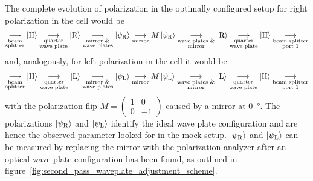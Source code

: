 The complete evolution of polarization in the optimally configured setup for right polarization in the cell would be
\begin{align}
    \label{eq:second_pass_waveplate_adjustment_cascade_r}
    \underset{\substack{\text{beam}\\\text{splitter}}}{\longrightarrow}
    \Ket{\text{H}} 
    \underset{\substack{\text{quarter}\\\text{wave plate}}}{\longrightarrow}
    \Ket{\text{R}}
    \underset{\substack{\text{mirror \&}\\\text{wave plates}}}{\longrightarrow}
    \Ket{\psi_\text{R}}
    \underset{\substack{\text{mirror}}}{\longrightarrow}
    M\Ket{\psi_\text{R}}
    \underset{\substack{\text{wave plates \&}\\\text{mirror}}}{\longrightarrow}
    \Ket{\text{R}}
    \underset{\substack{\text{quarter}\\\text{wave plate}}}{\longrightarrow}
    \Ket{\text{H}}
    \underset{\substack{\text{beam splitter}\\\text{port 1}}}{\longrightarrow}
\end{align}
and, analogously, for left polarization in the cell it would be
\begin{align}
    \label{eq:second_pass_waveplate_adjustment_cascade_l}
    \underset{\substack{\text{beam}\\\text{splitter}}}{\longrightarrow}
    \Ket{\text{H}} 
    \underset{\substack{\text{quarter}\\\text{wave plate}}}{\longrightarrow}
    \Ket{\text{L}}
    \underset{\substack{\text{mirror \&}\\\text{wave plates}}}{\longrightarrow}
    \Ket{\psi_\text{L}}
    \underset{\substack{\text{mirror}}}{\longrightarrow}
    M\Ket{\psi_\text{L}}
    \underset{\substack{\text{wave plates \&}\\\text{mirror}}}{\longrightarrow}
    \Ket{\text{L}}
    \underset{\substack{\text{quarter}\\\text{wave plate}}}{\longrightarrow}
    \Ket{\text{H}}
    \underset{\substack{\text{beam splitter}\\\text{port 1}}}{\longrightarrow}
\end{align}
with the polarization flip $M = \left(\begin{smallmatrix}1&0\\0&-1\end{smallmatrix}\right)$ caused by a mirror at \SI[]{0}{\degree}. The polarizations $\Ket{\psi_\text{R}}$ and $\Ket{\psi_\text{L}}$ identify the ideal wave plate configuration and are hence the observed parameter looked for in the mock setup. $\Ket{\psi_\text{R}}$ and $\Ket{\psi_\text{L}}$ can be measured by replacing the mirror with the polarization analyzer after an optical wave plate configuration has been found, as outlined in figure~\ref{fig:second_pass_waveplate_adjustment_scheme}.

